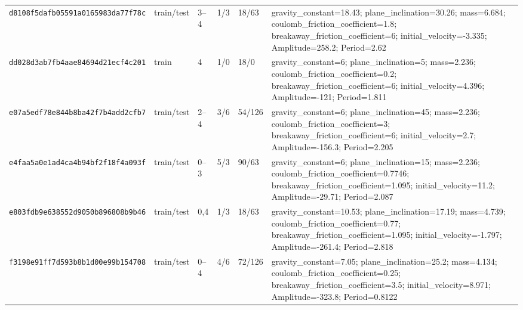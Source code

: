 \begin{tabular*}{\textwidth}{@{\extracolsep{\fill}}llllll@{}}
\texttt{d8108f5dafb05591a0165983da77f78c} & train/test & 3--4 & 1/3 & 18/63 & gravity\_constant=18.43; plane\_inclination=30.26; mass=6.684; coulomb\_friction\_coefficient=1.8; breakaway\_friction\_coefficient=6; initial\_velocity=-3.335; Amplitude=258.2; Period=2.62 \\
\texttt{dd028d3ab7fb4aae84694d21ecf4c201} & train & 4 & 1/0 & 18/0 & gravity\_constant=6; plane\_inclination=5; mass=2.236; coulomb\_friction\_coefficient=0.2; breakaway\_friction\_coefficient=6; initial\_velocity=4.396; Amplitude=-121; Period=1.811 \\
\texttt{e07a5edf78e844b8ba42f7b4add2cfb7} & train/test & 2--4 & 3/6 & 54/126 & gravity\_constant=6; plane\_inclination=45; mass=2.236; coulomb\_friction\_coefficient=3; breakaway\_friction\_coefficient=6; initial\_velocity=2.7; Amplitude=-156.3; Period=2.205 \\
\texttt{e4faa5a0e1ad4ca4b94bf2f18f4a093f} & train/test & 0--3 & 5/3 & 90/63 & gravity\_constant=6; plane\_inclination=15; mass=2.236; coulomb\_friction\_coefficient=0.7746; breakaway\_friction\_coefficient=1.095; initial\_velocity=11.2; Amplitude=-29.71; Period=2.087 \\
\texttt{e803fdb9e638552d9050b896808b9b46} & train/test & 0,4 & 1/3 & 18/63 & gravity\_constant=10.53; plane\_inclination=17.19; mass=4.739; coulomb\_friction\_coefficient=0.77; breakaway\_friction\_coefficient=1.095; initial\_velocity=-1.797; Amplitude=-261.4; Period=2.818 \\
\texttt{f3198e91ff7d593b8b1d00e99b154708} & train/test & 0--4 & 4/6 & 72/126 & gravity\_constant=7.05; plane\_inclination=25.2; mass=4.134; coulomb\_friction\_coefficient=0.25; breakaway\_friction\_coefficient=3.5; initial\_velocity=8.971; Amplitude=-323.8; Period=0.8122 \\
\bottomrule
\end{tabular*}
\endgroup
